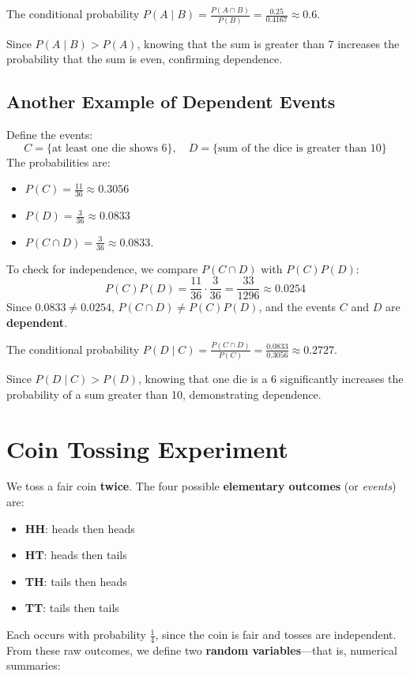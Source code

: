 \documentclass[11pt]{article}
\begin{document}
The conditional probability $P(A \mid B) = \frac{P(A \cap B)}{P(B)} = \frac{0.25}{0.4167} \approx 0.6$. 

Since $P(A \mid B) > P(A)$, knowing that the sum is greater than 7 increases the probability that the sum is even, confirming dependence.



\subsection{Another Example of Dependent Events}
Define the events:
\[
C = \{\text{at least one die shows 6}\}, \quad
D = \{\text{sum of the dice is greater than 10}\}
\]
The probabilities are:
\begin{itemize}
    \item $P(C) = \frac{11}{36} \approx 0.3056$
    \item $P(D) = \frac{3}{36} \approx 0.0833$
    \item $P(C \cap D) = \frac{3}{36} \approx 0.0833$.
\end{itemize}
To check for independence, we compare $P(C \cap D)$ with $P(C)P(D)$:
\[
P(C)P(D) = \frac{11}{36} \cdot \frac{3}{36} = \frac{33}{1296} \approx 0.0254
\]
Since $0.0833 \neq 0.0254$, $P(C \cap D) \neq P(C)P(D)$, and the events $C$ and $D$ are \textbf{dependent}.

The conditional probability $P(D \mid C) = \frac{P(C \cap D)}{P(C)} = \frac{0.0833}{0.3056} \approx 0.2727$. 

Since $P(D \mid C) > P(D)$, knowing that one die is a 6 significantly increases the probability of a sum greater than 10, demonstrating dependence.













\section{Coin Tossing Experiment}

We toss a fair coin \textbf{twice}. The four possible \textbf{elementary outcomes} (or \emph{events}) are:
\begin{itemize}
    \item \textbf{HH}: heads then heads  
    \item \textbf{HT}: heads then tails  
    \item \textbf{TH}: tails then heads  
    \item \textbf{TT}: tails then tails
    \end{itemize}
Each occurs with probability $ \frac{1}{4} $, since the coin is fair and tosses are independent.
From these raw outcomes, we define two \textbf{random variables}—that is, numerical summaries:
\end{document}
